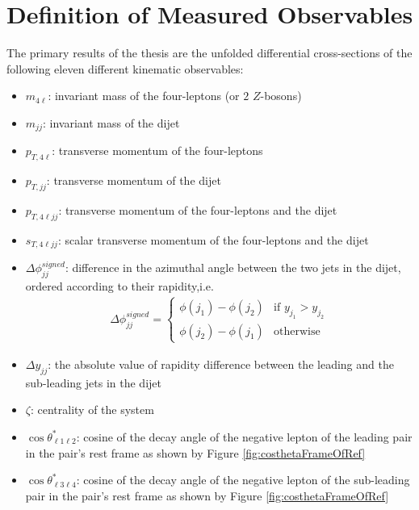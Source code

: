 \section{Definition of Measured Observables}
\label{sec:Obs}

The primary results of the thesis are the unfolded differential cross-sections of the following eleven different kinematic observables:

\begin{itemize}

\item{	$m_{4\ell}$: invariant mass of the four-leptons (or $2$ $Z$-bosons)}
\item{ 	$m_{jj}$:  invariant mass of the dijet}
\item{	$p_{T,4\ell}$: transverse momentum of the four-leptons }
\item{	$p_{T, jj}$: transverse momentum of the dijet }
\item{	$p_{T,4\ell jj}$: transverse momentum of the four-leptons and the dijet }
\item{	$s_{T,4\ell jj}$: scalar transverse momentum of the four-leptons and the dijet }
\item{ 	$\Delta \phi _{jj}^{signed}$: difference in the azimuthal angle between the two jets in the dijet, ordered according to their rapidity,i.e. 
\begin{align*}
	\Delta \phi _{jj}^{signed} = 
	\begin{cases}
	\phi(j_1)-\phi(j_2) & \text{if $y_{j_1} > y_{j_2}$}\\
	\phi(j_2)-\phi(j_1) & \text{otherwise}
	\end{cases} 
\end{align*}
}
\item{ $\Delta y_{jj}$: the absolute value of rapidity difference between the leading and the sub-leading jets in the dijet}
\item{ $\zeta$: centrality of the system}
\item{ $\cos \theta^{*}_{\ell 1 \ell 2}$: cosine of the decay angle of the negative lepton of the leading pair in the pair's rest frame as shown by Figure \ref{fig:costhetaFrameOfRef}}
\item{ $\cos \theta^{*}_{\ell 3 \ell 4}$: cosine of the decay angle of the negative lepton of the sub-leading pair in the pair's rest frame as shown by Figure \ref{fig:costhetaFrameOfRef} }

\end{itemize}

